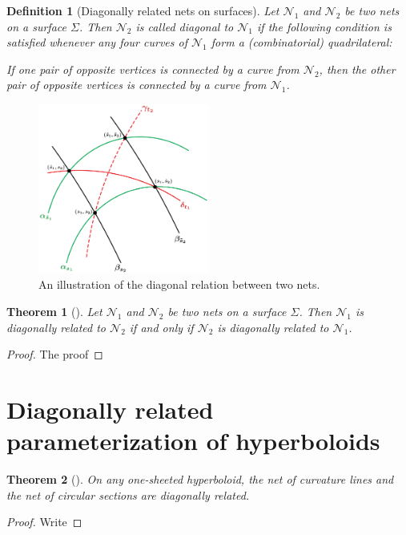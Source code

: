 \documentclass[12pt,a4paper]{article}
\theoremstyle{BoldTopSpacing}
\newtheorem{theorem}{Theorem}[section]
\theoremstyle{BoldTopSpacing}
\theoremstyle{BoldTopSpacing}
\theoremstyle{BoldTopBottomSpacing}
\newtheorem{definition}{Definition}[section]
\theoremstyle{BoldTopSpacing}
\theoremstyle{BoldTopBottomSpacing}
\theoremstyle{remark}
\begin{document}
\begin{definition}[Diagonally related nets on surfaces]
\label{def:diag-nets-on-surfaces}
Let $\mathcal{N}_{1}$ and $\mathcal{N}_{2}$ be two nets on a surface $\Sigma$. Then $\mathcal{N}_{2}$ is called diagonal
to $\mathcal{N}_{1}$ if the following condition is satisfied whenever any four curves of $\mathcal{N}_{1}$ form a
(combinatorial) quadrilateral: \newline
\begin{mathbox}{}
If one pair of opposite vertices is connected by a curve from $\mathcal{N}_{2}$, then the other pair of opposite vertices is connected by a curve from $\mathcal{N}_{1}$.
\end{mathbox}
\end{definition}

\begin{figure}[H]
    \centering
    \includegraphics[width=0.5\textwidth]{diagonally_related_diagram.png}
    \caption{An illustration of the diagonal relation between two nets.}
    \label{fig:diagonally-related-diagram}
\end{figure}

\begin{theorem}[]
\label{thm:symmetric-definition-diagonal-nets}
Let $\mathcal{N}_1$ and $\mathcal{N}_2$ be two nets on a surface $\Sigma$. Then $\mathcal{N}_1$ is diagonally related to
$\mathcal{N}_2$ if and only if $\mathcal{N}_2$ is diagonally related to $\mathcal{N}_1$.
\end{theorem}

\begin{proof}
    The proof
\end{proof}
\pagebreak
\section{Diagonally related parameterization of hyperboloids}
\begin{theorem}[]
\label{thm:diagonally-related-one-sheeted}
On any one-sheeted hyperboloid, the net of curvature lines and the net of circular sections are diagonally related.
\end{theorem}
\begin{proof}
    Write
\end{proof}
\end{document}

